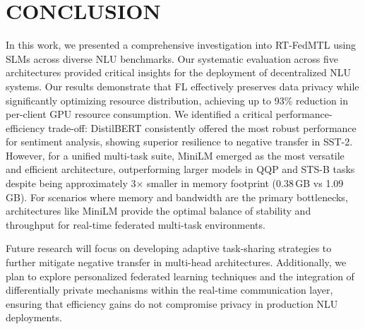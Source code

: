 \section{CONCLUSION}
\label{sec:conclusion}

In this work, we presented a comprehensive investigation into RT-FedMTL using SLMs across diverse NLU benchmarks. Our systematic evaluation across five architectures provided critical insights for the deployment of decentralized NLU systems. Our results demonstrate that FL effectively preserves data privacy while significantly optimizing resource distribution, achieving up to 93\% reduction in per-client GPU resource consumption. We identified a critical performance-efficiency trade-off: DistilBERT consistently offered the most robust performance for sentiment analysis, showing superior resilience to negative transfer in SST-2. However, for a unified multi-task suite, MiniLM emerged as the most versatile and efficient architecture, outperforming larger models in QQP and STS-B tasks despite being approximately 3$\times$ smaller in memory footprint (0.38\,GB vs 1.09\,GB). For scenarios where memory and bandwidth are the primary bottlenecks, architectures like MiniLM provide the optimal balance of stability and throughput for real-time federated multi-task environments.

Future research will focus on developing adaptive task-sharing strategies to further mitigate negative transfer in multi-head architectures. Additionally, we plan to explore personalized federated learning techniques and the integration of differentially private mechanisms within the real-time communication layer, ensuring that efficiency gains do not compromise privacy in production NLU deployments.
